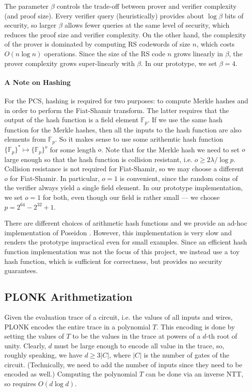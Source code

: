 \documentclass{zamarep}
\newcommand{\field}{\mathbb{F}}
\begin{document}
The parameter $\beta$ controls the trade-off between prover and verifier complexity (and proof size). Every verifier query (heuristically) provides about $\log \beta$ bits of security, so larger $\beta$ allows fewer queries at the same level of security, which reduces the proof size and verifier complexity. On the other hand, the complexity of the prover is dominated by computing RS codewords of size $n$, which costs $O(n \log n)$ operations. Since the size of the RS code $n$ grows linearly in $\beta$, the prover complexity grows super-linearly with $\beta$. In our prototype, we set $\beta = 4$.

\paragraph{A Note on Hashing}
For the PCS, hashing is required for two purposes: to compute Merkle hashes and in order to perform the Fiat-Shamir transform. The latter requires that the output of the hash function is a field element $\field_p$. If we use the same hash function for the Merkle hashes, then all the inputs to the hash function are also elements from $\field_p$. So it makes sense to use some arithemtic hash function $\{\field_p\}^* \mapsto \{\field_p \}^o$ for some length $o$. Note that for the Merkle hash we need to set $o$ large enough so that the hash function is collision resistant, i.e. $o \geq 2 \lambda / \log p$. Collision resistance is not required for Fiat-Shamir, so we may choose a different $o$ for Fiat-Shamir. In particular, $o=1$ is convenient, since the random coins of the verifier always yield a single field element. In our prototype implementation, we set $o = 1$ for both, even though our field is rather small --- we choose $p = 2^{64} - 2^{32} + 1$. 

There are different choices of arithmetic hash functions and we provide an ad-hoc implementation of Poseidon \cite{USENIX:GKRRS21}. However, this implementation is very slow and renders the prototype impractical even for small examples. Since an efficient hash function implementation was not the focus of this project, we instead use a toy hash function, which is sufficient for correctness, but provides no security guarantees. 

\subsection{PLONK Arithmetization}
\label{sec:plonk}
Given the evaluation trace of a circuit, i.e. the values of all inputs and wires, PLONK encodes the entire trace in a polynomial $T$. This encoding is done by setting the values of $T$ to be the values in the trace at powers of a $d$-th root of unity. Clearly, $d$ must be large enough to encode all value in the trace, so, roughly speaking, we have $d \geq 3 \lvert C \rvert$, where $\lvert C \rvert$ is the number of gates of the circuit. (Technically, we need to add the number of inputs since they need to be encoded as well.) Computing the polynomial $T$ can be done via an inverse NTT, so requires $O(d \log d)$.
\end{document}
